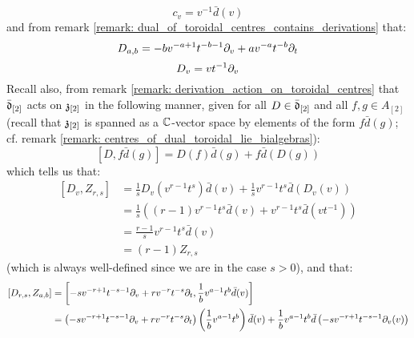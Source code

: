 \begin{remark}
\begin{enumerate}
\begin{enumerate}
\begin{enumerate}
                                $$c_v = v^{-1} \bar{d}(v)$$
                            and from remark \ref{remark: dual_of_toroidal_centres_contains_derivations} that:
                                $$D_{a, b} = -b v^{-a + 1} t^{-b - 1} \del_v + a v^{-a} t^{-b} \del_t$$
                                $$D_v = v t^{-1} \del_v$$
                            Recall also, from remark \ref{remark: derivation_action_on_toroidal_centres} that $\bar{\d}_{[2]}$ acts on $\z_{[2]}$ in the following manner, given for all $D \in \bar{\d}_{[2]}$ and all $f, g \in A_{[2]}$ (recall that $\z_{[2]}$ is spanned as a $\bbC$-vector space by elements of the form $f \bar{d}(g)$; cf. remark \ref{remark: centres_of_dual_toroidal_lie_bialgebras}):
                                $$[D, f \bar{d}(g)] = D(f) \bar{d}(g) + f \bar{d}( D(g) )$$
                            which tells us that:
                                $$
                                    \begin{aligned}
                                        [D_v, Z_{r, s}] & = \frac1s D_v( v^{r - 1} t^s ) \bar{d}(v) + \frac1s v^{r - 1} t^s \bar{d}(D_v(v))
                                        \\
                                        & = \frac1s \left( (r - 1) v^{r - 1} t^s \bar{d}(v) + v^{r - 1} t^s \bar{d}(v t^{-1}) \right)
                                        \\
                                        & = \frac{r - 1}{s} v^{r - 1} t^s \bar{d}(v) 
                                        \\
                                        & = (r - 1) Z_{r, s}
                                    \end{aligned}
                                $$
                            (which is always well-defined since we are in the case $s > 0$), and that:
                                $$
                                    \begin{aligned}
                                        [D_{r, s}, Z_{a, b}] & = \left[ -s v^{-r + 1} t^{-s - 1} \del_v + r v^{-r} t^{-s} \del_t, \frac1b v^{a - 1} t^b \bar{d}(v) \right]
                                        \\
                                        & = \left( -s v^{-r + 1} t^{-s - 1} \del_v + r v^{-r} t^{-s} \del_t \right)\left( \frac1b v^{a - 1} t^b \right) \bar{d}(v) + \frac1b v^{a - 1} t^b \bar{d}\left( -s v^{-r + 1} t^{-s - 1} \del_v(v) \right)
                                        \\

\end{aligned}$$
\end{enumerate}
\end{enumerate}
\end{enumerate}
\end{remark}
